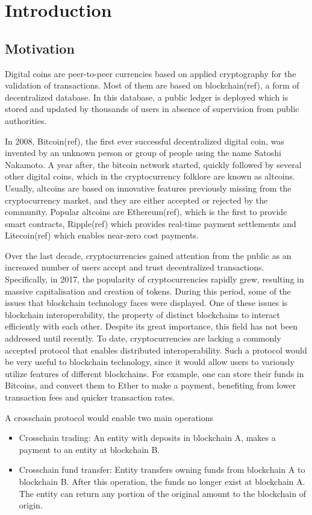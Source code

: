 \section{Introduction}

\subsection{Motivation}

Digital coins are peer-to-peer currencies based on applied cryptography
for the validation of transactions. Most of them are based on
blockchain(ref), a form of decentralized database. In this database, a
public ledger is deployed which is stored and updated by thousands of
users in absence of supervision from public authorities.

In 2008, Bitcoin(ref), the first ever successful decentralized digital
coin, was invented by an unknown person or group of people using the
name Satoshi Nakamoto. A year after, the bitcoin network started,
quickly followed by several other digital coins, which in the
cryptocurrency folklore are known as altcoins. Usually, altcoins are
based on innovative features previously missing from the cryptocurrency
market, and they are either accepted or rejected by the community.
Popular altcoins are Ethereum(ref), which is the first to provide smart
contracts, Ripple(ref) which provides real-time payment settlements and
Litecoin(ref) which enables near-zero cost payments.

Over the last decade, cryptocurrencies gained attention from the public
as an increased number of users accept and trust decentralized
transactions. Specifically, in 2017, the popularity of cryptocurrencies
rapidly grew, resulting in massive capitalisation and creation of
tokens. During this period, some of the issues that blockchain
technology faces were displayed. One of these issues is blockchain
interoperability, the property of distinct blockchains to interact
efficiently with each other. Despite its great importance, this field
has not been addressed until recently. To date, cryptocurrencies are
lacking a commonly accepted protocol that enables distributed
interoperability. Such a protocol would be very useful to blockchain
technology, since it would allow users to variously utilize features of
different blockchains. For example, one can store their funds in
Bitcoins, and convert them to Ether to make a payment, benefiting from
lower transaction fees and quicker transaction rates.

A crosschain protocol would enable two main operations
\begin{itemize}
    \item
        Crosschain trading: An entity with deposits in blockchain A, makes a
        payment to an entity at blockchain B.
    \item
        Crosschain fund transfer: Entity transfers owning funds from
        blockchain A to blockchain B. After this operation, the funds no
        longer exist at blockchain A. The entity can return any portion of the
        original amount to the blockchain of origin.
\end{itemize}

